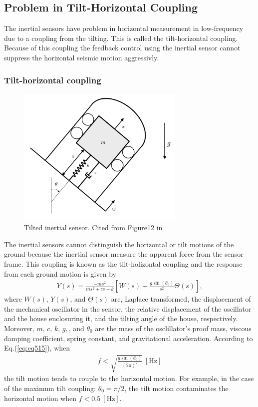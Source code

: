 \subsection{Problem in Tilt-Horizontal Coupling}
The inertial sensors have problem in horizontal measurement in low-frequency due to a coupling from the tilting. This is called the tilt-horizontal coupling. Because of this coupling the feedback control using the inertial sensor cannot suppress the horizontal seismic motion aggressivly.

\subsubsection{Tilt-horizontal coupling}
\begin{figure}[h]
  \begin{center}   
    \includegraphics[width=8cm]{./img_chap5/img509.png}
    \caption{Tilted inertial sensor. Cited from Figure12 in \cite{collette2012inertial}} \label{img:img509}
  \end{center}
\end{figure}
 The inertial sensors cannot distinguish the horizontal or tilt motions of the ground because the inertial sensor measure the apparent force from the sensor frame. This coupling is known as the tilt-holizontal coupling and the response from each ground motion is given by \cite{collette2012inertial}
\begin{eqnarray}
  Y(s)=\frac{-m s^{2}}{m s^{2}+c s+k} \left[ W(s) + \frac{g \sin \left(\theta_{0}\right)}{s^2} \Theta(s) \right] \label{eq:eq515},
\end{eqnarray}
where $W(s),\,Y(s)$, and $\Theta(s)$ are, Laplace transformed, the displacement of the mechanical oscillator in the sensor, the relative displacement of the oscillator and the house enclosuring it, and the tilting angle of the house, respectively. Moreover, $m,\,c,\,k,\,g,$, and $\theta_0$ are the mass of the osclillator's proof mass, viscous damping coefficient, spring constant, and gravitational acceleration. According to Eq.(\ref{eq:eq515}), when 
\begin{eqnarray}
  f < \sqrt{\frac{g\sin(\theta_0)}{(2\pi)^2}}\ [\mathrm{Hz}]
  \label{eq:eq515}
\end{eqnarray}
the tilt motion tends to couple to the horizontal motion. For example, in the case of the maximum tilt coupling: $\theta_0=\pi/2$, the tilt motion contaminates the horizontal motion when $f<0.5\ [\mathrm{Hz}]$.

